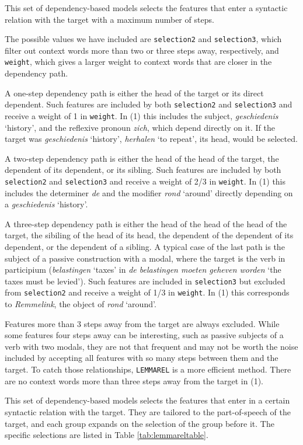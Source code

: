 \documentclass[
]{book}
\providecommand{\tightlist}{%
  \setlength{\itemsep}{0pt}\setlength{\parskip}{0pt}}
\begin{document}
\begin{description}
\tightlist
\item[\texttt{LEMMAPATH}]
This set of dependency-based models selects the features that enter a syntactic
relation with the target with a maximum number of steps.

The possible values we have included are \texttt{selection2} and \texttt{selection3}, which filter
out context words more than two or three steps away, respectively, and \texttt{weight}, which
gives a larger weight to context words that are closer in the dependency path.

A one-step dependency path is either the head of the target or its direct dependent.
Such features are included by both \texttt{selection2} and \texttt{selection3} and receive a weight of 1 in \texttt{weight}.
In (1) this includes the subject, \emph{geschiedenis} `history', and the reflexive pronoun \emph{zich},
which depend directly on it. If the target was \emph{geschiedenis} `history', \emph{herhalen} `to repeat',
its head, would be selected.

A two-step dependency path is either the head of the head of the target, the dependent of its dependent,
or its sibling. Such features are included by both \texttt{selection2} and \texttt{selection3} and receive a weight of 2/3 in \texttt{weight}.
In (1) this includes the determiner \emph{de} and the modifier \emph{rond} `around' directly depending on
a \emph{geschiedenis} `history'.

A three-step dependency path is either the head of the head of the head of the target,
the sibiling of the head of its head, the dependent of the dependent of its dependent,
or the dependent of a sibling. A typical case of the last path is the subject of a passive construction with a modal,
where the target is the verb in participium (\emph{belastingen} `taxes' in \emph{de belastingen moeten geheven worden} `the taxes must be levied').
Such features are included in \texttt{selection3} but excluded from \texttt{selection2} and receive a weight of 1/3 in \texttt{weight}.
In (1) this corresponds to \emph{Remmelink}, the object of \emph{rond} `around'.

Features more than 3 steps away from the target are always excluded.
While some features four steps away can be interesting, such as passive subjects of a verb with two modals, they are not that frequent and may not be worth the noise included by accepting all features with so many steps between them and the target. To catch those relationships, \texttt{LEMMAREL} is a more efficient method.
There are no context words more than three steps away from the target in (1).
\item[\texttt{LEMMAREL}]
This set of dependency-based models selects the features that enter in a certain
syntactic relation with the target. They are tailored to the part-of-speech of the target,
and each group expands on the selection of the group before it. The specific selections
are listed in Table \ref{tab:lemmareltable}.
\end{description}
\end{document}
